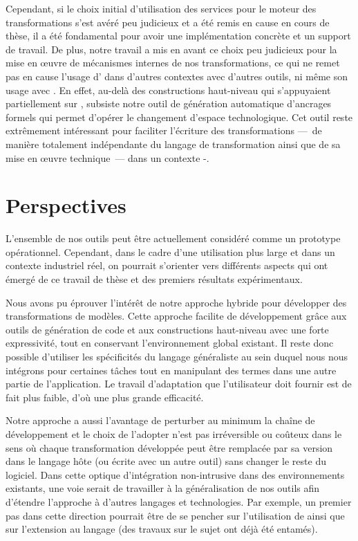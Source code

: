 Cependant, si le choix initial d'utilisation des services {\emf} pour le moteur
des transformations s'est avéré peu judicieux et a été remis en cause en cours
de thèse, il a été fondamental pour avoir une implémentation concrète et un
support de travail. De plus, notre travail a mis en avant ce choix peu
judicieux pour la mise en œuvre de mécanismes internes de nos transformations,
ce qui ne remet pas en cause l'usage d'{\emf} dans d'autres contextes avec
d'autres outils, ni même son usage avec {\tom}. En effet, au-delà des
constructions haut-niveau qui s'appuyaient partiellement sur {\emf}, subsiste
notre outil de génération automatique d'ancrages formels qui permet d'opérer le
changement d'espace technologique. 
Cet outil reste extrêmement intéressant pour faciliter l'écriture des
transformations ---~de manière totalement indépendante du langage de
transformation ainsi que de sa mise en œuvre technique~--- dans un contexte
{\java}-{\emf}.


\section{Perspectives}
\label{ch:evaluation:perspectives}

L'ensemble de nos outils peut être actuellement considéré comme un prototype
opérationnel. Cependant, dans le cadre d'une utilisation plus large et dans un
contexte industriel réel, on pourrait s'orienter vers différents aspects qui
ont émergé de ce travail de thèse et des premiers résultats expérimentaux.

Nous avons pu éprouver l'intérêt de notre approche hybride pour développer des
transformations de modèles. Cette approche facilite de développement grâce aux
outils de génération de code et aux constructions haut-niveau avec une forte
expressivité, tout en conservant l'environnement global existant. Il reste donc
possible d'utiliser les spécificités du langage généraliste au sein duquel nous
nous intégrons pour certaines tâches tout en manipulant des termes dans une
autre partie de l'application. Le travail d'adaptation que l'utilisateur doit
fournir est de fait plus faible, d'où une plus grande efficacité.

Notre approche a aussi l'avantage de perturber au minimum la chaîne de
développement et le choix de l'adopter n'est pas irréversible ou coûteux dans
le sens où chaque transformation développée peut être remplacée par sa version
dans le langage hôte (ou écrite avec un autre outil) sans changer le reste du
logiciel. Dans cette optique d'intégration non-intrusive dans des
environnements existants, une voie serait de travailler à la généralisation de
nos outils afin d'étendre l'approche à d'autres langages et technologies. Par
exemple, un premier pas dans cette direction pourrait être de se pencher sur
l'utilisation de {\kevoree} ainsi que sur l'extension au langage {\ada} (des
travaux sur le sujet ont déjà été entamés).

